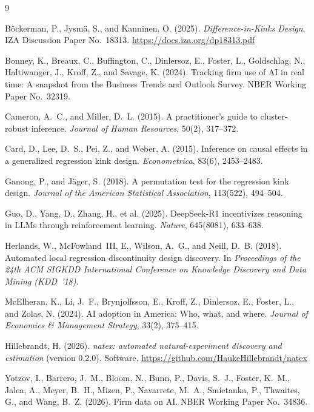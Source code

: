 \documentclass[11pt]{article}
\begin{document}
\footnotesize
\begin{thebibliography}{9}
\setlength{\itemsep}{2pt}\setlength{\parskip}{0pt}

B\"ockerman, P., Jysm\"a, S., and Kanninen, O. (2025).
\emph{Difference-in-Kinks Design}.
IZA Discussion Paper No.~18313.
\url{https://docs.iza.org/dp18313.pdf}

Bonney, K., Breaux, C., Buffington, C., Dinlersoz, E., Foster, L., Goldschlag,
N., Haltiwanger, J., Kroff, Z., and Savage, K. (2024).
Tracking firm use of AI in real time: A snapshot from the Business Trends and
Outlook Survey.
NBER Working Paper No.~32319.

Cameron, A.~C., and Miller, D.~L. (2015).
A practitioner's guide to cluster-robust inference.
\emph{Journal of Human Resources}, 50(2), 317--372.

Card, D., Lee, D.~S., Pei, Z., and Weber, A. (2015).
Inference on causal effects in a generalized regression kink design.
\emph{Econometrica}, 83(6), 2453--2483.

Ganong, P., and J\"ager, S. (2018).
A permutation test for the regression kink design.
\emph{Journal of the American Statistical Association}, 113(522), 494--504.

Guo, D., Yang, D., Zhang, H., et al. (2025).
DeepSeek-R1 incentivizes reasoning in LLMs through reinforcement learning.
\emph{Nature}, 645(8081), 633--638.

Herlands, W., McFowland~III, E., Wilson, A.~G., and Neill, D.~B. (2018).
Automated local regression discontinuity design discovery.
In \emph{Proceedings of the 24th ACM SIGKDD International Conference on
Knowledge Discovery and Data Mining (KDD~'18)}.

McElheran, K., Li, J.~F., Brynjolfsson, E., Kroff, Z., Dinlersoz, E., Foster,
L., and Zolas, N. (2024).
AI adoption in America: Who, what, and where.
\emph{Journal of Economics \& Management Strategy}, 33(2), 375--415.

Hillebrandt, H. (2026).
\emph{natex: automated natural-experiment discovery and estimation} (version
0.2.0). Software.
\url{https://github.com/HaukeHillebrandt/natex}

Yotzov, I., Barrero, J.~M., Bloom, N., Bunn, P., Davis, S.~J., Foster, K.~M.,
Jalca, A., Meyer, B.~H., Mizen, P., Navarrete, M.~A., Smietanka, P., Thwaites,
G., and Wang, B.~Z. (2026).
Firm data on AI.
NBER Working Paper No.~34836.

\end{thebibliography}
\end{document}
